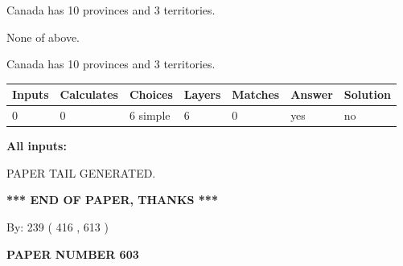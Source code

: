 \documentclass[12pt]{article}
\begin{document}
 
Canada has 10  provinces and 3 territories.
 
 
 None of above.
 
 
\noindent{}
 
 
Canada has 10  provinces and 3 territories.
 
 
\noindent{}
 
 
   
   
   
   
\noindent\begin{tabular}{|l|l|l|l|l|l|l|}
 \hline
Inputs & Calculates & Choices & Layers & Matches & Answer & Solution \\ \hline
 0  & 
 0  & 
 6
  simple  
  & 
 6  & 
 0  & 
  yes & 
  no 
  \\ \hline
 \end{tabular}
   
   
   
   
\noindent{}
   
   
   
   
\noindent\vspace{0.1in}\hspace{-0.08in} {\textbf{\Large{All inputs: }}}
   
   
   
   
   
   
 \vspace{0.2in}
 
   
   
\vspace{2.0in} PAPER TAIL GENERATED.
   
   
   
   
\vspace{1.0in} 
{\textbf{\large{ *** END OF PAPER, THANKS *** }}} 
   
   
\hspace{1.0in} By: 
 239 ( 416 ,  613 )
   
   
   
   
\newpage 
\setcounter{page}{ 
   603001 } 
   
   
   
   
 {\textbf{ \Large{ PAPER NUMBER  603  }}}
   
\end{document}
